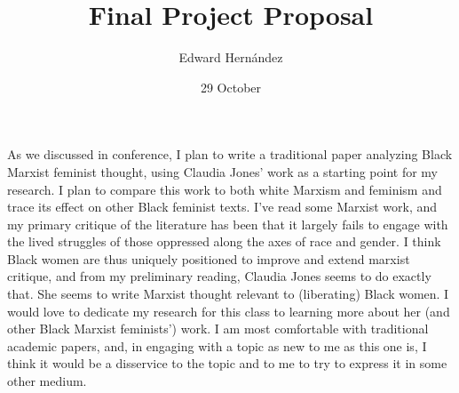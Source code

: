 \documentclass[doc,12pt]{apa6}
\begin{document}
\title{Final Project Proposal}
\author{Edward Hern\'{a}ndez}
\date{29 October}
\maketitle

As we discussed in conference, I plan to write a traditional paper analyzing
Black Marxist feminist thought, using Claudia Jones' work as a starting point
for my research. I plan to compare this work to both white Marxism and feminism
and trace its effect on other Black feminist texts. I've read some Marxist
work, and my primary critique of the literature has been that it largely fails
to engage with the lived struggles of those oppressed along the axes of race
and gender. I think Black women are thus uniquely positioned to improve and
extend marxist critique, and from my preliminary reading, Claudia Jones seems
to do exactly that. She seems to write Marxist thought relevant to (liberating)
Black women. I would love to dedicate my research for this class to learning
more about her (and other Black Marxist feminists') work. I am most comfortable
with traditional academic papers, and, in engaging with a topic as new to me as
this one is, I think it would be a disservice to the topic and to me to try to
express it in some other medium.
%
\end{document}
